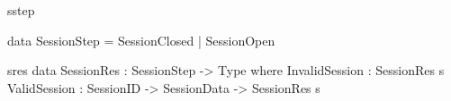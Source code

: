 \begin{SaveVerbatim}{sstep}

data SessionStep = SessionClosed | SessionOpen
\end{SaveVerbatim}

\begin{SaveVerbatim}{sres}
data SessionRes : SessionStep -> Type where
  InvalidSession : SessionRes s  
  ValidSession   : SessionID -> 
                   SessionData -> 
                   SessionRes s

\end{SaveVerbatim}




